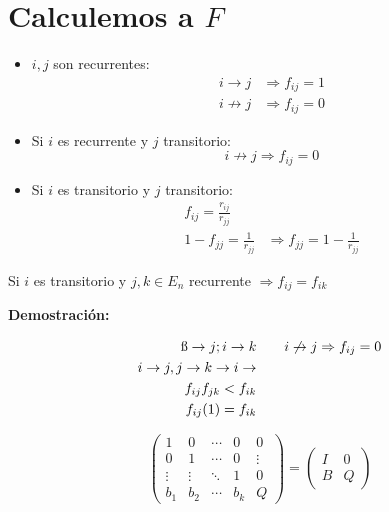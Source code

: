 \section*{Calculemos a $F$}

\begin{itemize}
\item $i, j$ son recurrentes:
\begin{align*}
    i \to j  & \Rightarrow f_{ij} = 1 \\
    i \not\to j & \Rightarrow f_{ij} = 0
\end{align*}

\item Si $i$ es recurrente y $j$ transitorio:
\[
i \not\to j \Rightarrow f_{ij} = 0
\]

\item Si $i$ es transitorio y $j$ transitorio:
\begin{align*}
    f_{ij} = \frac{r_{ij}}{r_{jj}} & \\
    1 - f_{jj} = \frac{1}{r_{jj}} & \Rightarrow f_{jj} = 1 - \frac{1}{r_{jj}}
\end{align*}

\end{itemize}

\begin{teo}{}{}
    Si $i$ es transitorio y $j, k \in E_{n}$ recurrente $\Rightarrow f_{ij} = f_{ik}$
\end{teo}

\textbf{Demostración:}

\begin{align*}
    \i \to j; i \to k & \qquad i \not\to j \Rightarrow f_{ij} = 0 \\
    i \to j, j \to k \rightarrow i \to & \\
    f_{ij} f_{jk} < f_{ik} & \\
    f_{ij} (1) = f_{ik} &
\end{align*}

\[
\begin{pmatrix*}
    1 & 0 & \cdots & 0 & 0 \\
    0 & 1 & \cdots & 0 & \vdots \\
    \vdots & \vdots & \ddots & 1 & 0 \\
    b_{1} & b_{2} & \cdots & b_{k} & Q
\end{pmatrix*} = \begin{pmatrix}
    I & 0 \\
    B & Q
\end{pmatrix}
\]


